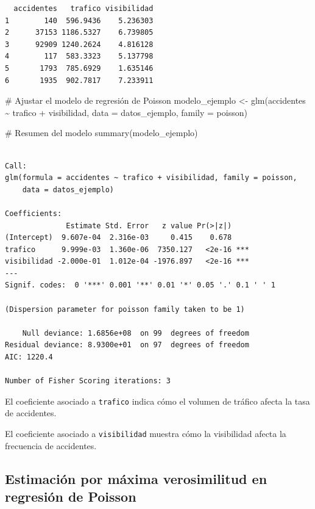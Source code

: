 \documentclass[
  letterpaper,
  DIV=11,
  numbers=noendperiod]{scrreprt}
\newenvironment{Shaded}{\begin{snugshade}}{\end{snugshade}}
\newcommand{\AttributeTok}[1]{\textcolor[rgb]{0.40,0.45,0.13}{#1}}
\newcommand{\CommentTok}[1]{\textcolor[rgb]{0.37,0.37,0.37}{#1}}
\newcommand{\FunctionTok}[1]{\textcolor[rgb]{0.28,0.35,0.67}{#1}}
\newcommand{\NormalTok}[1]{\textcolor[rgb]{0.00,0.23,0.31}{#1}}
\newcommand{\OtherTok}[1]{\textcolor[rgb]{0.00,0.23,0.31}{#1}}
\newcommand{\SpecialCharTok}[1]{\textcolor[rgb]{0.37,0.37,0.37}{#1}}
\begin{document}
\begin{tcolorbox}
\begin{verbatim}
  accidentes   trafico visibilidad
1        140  596.9436    5.236303
2      37153 1186.5327    6.739805
3      92909 1240.2624    4.816128
4        117  583.3323    5.137798
5       1793  785.6929    1.635146
6       1935  902.7817    7.233911
\end{verbatim}

\begin{Shaded}
\begin{Highlighting}[]
\CommentTok{\# Ajustar el modelo de regresión de Poisson}
\NormalTok{modelo\_ejemplo }\OtherTok{\textless{}{-}} \FunctionTok{glm}\NormalTok{(accidentes }\SpecialCharTok{\textasciitilde{}}\NormalTok{ trafico }\SpecialCharTok{+}\NormalTok{ visibilidad, }\AttributeTok{data =}\NormalTok{ datos\_ejemplo, }\AttributeTok{family =}\NormalTok{ poisson)}

\CommentTok{\# Resumen del modelo}
\FunctionTok{summary}\NormalTok{(modelo\_ejemplo)}
\end{Highlighting}
\end{Shaded}

\begin{verbatim}

Call:
glm(formula = accidentes ~ trafico + visibilidad, family = poisson, 
    data = datos_ejemplo)

Coefficients:
              Estimate Std. Error   z value Pr(>|z|)    
(Intercept)  9.607e-04  2.316e-03     0.415    0.678    
trafico      9.999e-03  1.360e-06  7350.127   <2e-16 ***
visibilidad -2.000e-01  1.012e-04 -1976.897   <2e-16 ***
---
Signif. codes:  0 '***' 0.001 '**' 0.01 '*' 0.05 '.' 0.1 ' ' 1

(Dispersion parameter for poisson family taken to be 1)

    Null deviance: 1.6856e+08  on 99  degrees of freedom
Residual deviance: 8.9300e+01  on 97  degrees of freedom
AIC: 1220.4

Number of Fisher Scoring iterations: 3
\end{verbatim}

El coeficiente asociado a \texttt{trafico} indica cómo el volumen de
tráfico afecta la tasa de accidentes.

El coeficiente asociado a \texttt{visibilidad} muestra cómo la
visibilidad afecta la frecuencia de accidentes.

\end{tcolorbox}

\subsection{Estimación por máxima verosimilitud en regresión de
Poisson}\label{estimaciuxf3n-por-muxe1xima-verosimilitud-en-regresiuxf3n-de-poisson}
\end{document}
